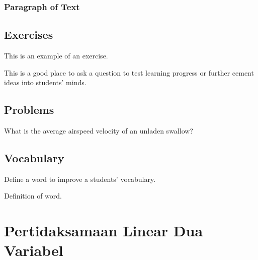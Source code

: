 \documentclass[11pt,fleqn]{book} %
\begin{document}
\subsection{Paragraph of Text}

\begin{example}
\lipsum[2]
\end{example}


\section{Exercises}

This is an example of an exercise.

\begin{exercise}
This is a good place to ask a question to test learning progress or further cement ideas into students' minds.
\end{exercise}


\section{Problems}

\begin{problem}
What is the average airspeed velocity of an unladen swallow?
\end{problem}


\section{Vocabulary}

Define a word to improve a students' vocabulary.

\begin{vocabulary}[Word]
Definition of word.
\end{vocabulary}


\chapter{Pertidaksamaan Linear Dua Variabel}
\end{document}
